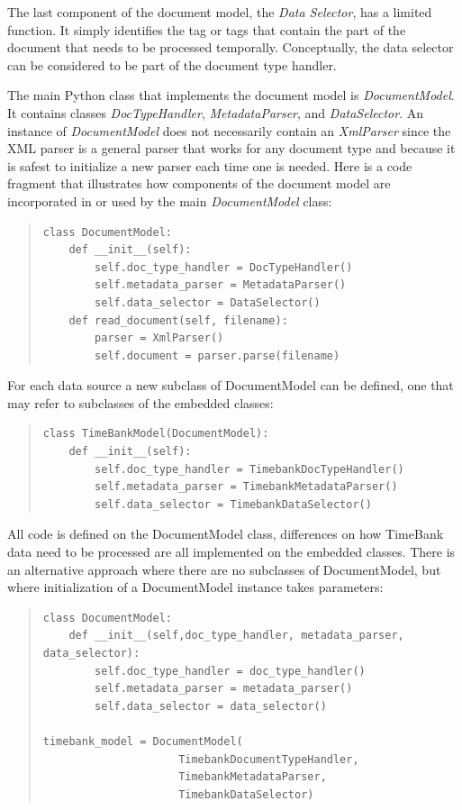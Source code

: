 \documentclass[11pt]{article}
\begin{document}
The last component of the document model, the {\em Data Selector}, has a limited function. It simply identifies the tag or tags that contain the part of the document that needs to be processed temporally. Conceptually, the data selector can be considered to be part of the document type handler.

The main Python class that implements the document model is {\em DocumentModel}. It contains classes {\em DocTypeHandler}, {\em MetadataParser}, and {\em DataSelector}. An instance of {\em DocumentModel} does not necessarily contain an {\em XmlParser} since the XML parser is a general parser that works for any document type and because it is safest to initialize a new parser each time one is needed. Here is a code fragment that illustrates how components of the document model are incorporated in or used by the main {\em DocumentModel} class:

\begin{quote}
\begin{verbatim}
class DocumentModel:
    def __init__(self):
        self.doc_type_handler = DocTypeHandler()
        self.metadata_parser = MetadataParser()
        self.data_selector = DataSelector()
    def read_document(self, filename):
        parser = XmlParser()
        self.document = parser.parse(filename)
\end{verbatim}
\end{quote}

For each data source a new subclass of DocumentModel can be defined, one that may refer to subclasses of the embedded classes:

\begin{quote}
\begin{verbatim}
class TimeBankModel(DocumentModel):
    def __init__(self):
        self.doc_type_handler = TimebankDocTypeHandler()
        self.metadata_parser = TimebankMetadataParser()
        self.data_selector = TimebankDataSelector()
\end{verbatim}
\end{quote}

All code is defined on the DocumentModel class, differences on how TimeBank data need to be processed are all implemented on the embedded classes. There is an alternative approach where there are no subclasses of DocumentModel, but where initialization of a DocumentModel instance takes parameters:

\begin{quote}
\begin{verbatim}
class DocumentModel:
    def __init__(self,doc_type_handler, metadata_parser, data_selector):
        self.doc_type_handler = doc_type_handler()
        self.metadata_parser = metadata_parser()
        self.data_selector = data_selector()
        
timebank_model = DocumentModel(
                     TimebankDocumentTypeHandler, 
                     TimebankMetadataParser, 
                     TimebankDataSelector)
\end{verbatim}
\end{quote}
\end{document}
